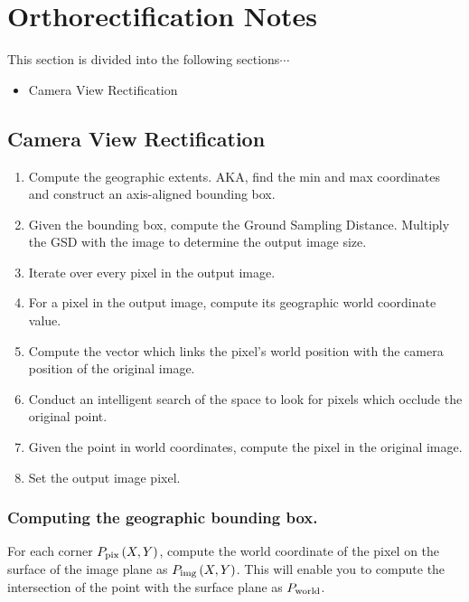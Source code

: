 \chapter*{Orthorectification Notes}

This section is divided into the following sections$\cdots$

\begin{itemize}
\item[] Camera View Rectification
\end{itemize}
  
\section*{Camera View Rectification}

\begin{enumerate}
\item Compute the geographic extents.  AKA, find the min and max coordinates
      and construct an axis-aligned bounding box. 
\item Given the bounding box, compute the Ground Sampling Distance.  Multiply the 
      GSD with the image to determine the output image size.
\item Iterate over every pixel in the output image. 
\item For a pixel in the output image, compute its geographic world coordinate value. 
\item Compute the vector which links the pixel's world position with the camera position
      of the original image. 
\item Conduct an intelligent search of the space to look for pixels which occlude
      the original point.
\item Given the point in world coordinates, compute the pixel in the original image. 
\item Set the output image pixel. 
\end{enumerate}


\subsection*{Computing the geographic bounding box.}

For each corner $P_{\textup{pix}}\left( X, Y\right)$, compute the world coordinate of the pixel on the surface of the 
image plane as $P_{\textup{img}}\left( X, Y\right)$.  This will enable you to compute the intersection of the point
with the surface plane as $P_{\textup{world}}$.

